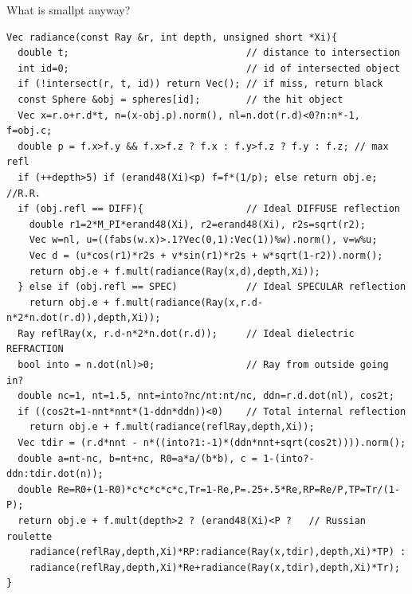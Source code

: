 \documentclass[8pt]{beamer}
\begin{document}
\begin{frame}[fragile]{What is smallpt anyway?}
\footnotesize
\begin{verbatim}
Vec radiance(const Ray &r, int depth, unsigned short *Xi){ 
  double t;                               // distance to intersection 
  int id=0;                               // id of intersected object 
  if (!intersect(r, t, id)) return Vec(); // if miss, return black 
  const Sphere &obj = spheres[id];        // the hit object 
  Vec x=r.o+r.d*t, n=(x-obj.p).norm(), nl=n.dot(r.d)<0?n:n*-1, f=obj.c; 
  double p = f.x>f.y && f.x>f.z ? f.x : f.y>f.z ? f.y : f.z; // max refl 
  if (++depth>5) if (erand48(Xi)<p) f=f*(1/p); else return obj.e; //R.R. 
  if (obj.refl == DIFF){                  // Ideal DIFFUSE reflection 
    double r1=2*M_PI*erand48(Xi), r2=erand48(Xi), r2s=sqrt(r2); 
    Vec w=nl, u=((fabs(w.x)>.1?Vec(0,1):Vec(1))%w).norm(), v=w%u; 
    Vec d = (u*cos(r1)*r2s + v*sin(r1)*r2s + w*sqrt(1-r2)).norm(); 
    return obj.e + f.mult(radiance(Ray(x,d),depth,Xi)); 
  } else if (obj.refl == SPEC)            // Ideal SPECULAR reflection 
    return obj.e + f.mult(radiance(Ray(x,r.d-n*2*n.dot(r.d)),depth,Xi)); 
  Ray reflRay(x, r.d-n*2*n.dot(r.d));     // Ideal dielectric REFRACTION 
  bool into = n.dot(nl)>0;                // Ray from outside going in? 
  double nc=1, nt=1.5, nnt=into?nc/nt:nt/nc, ddn=r.d.dot(nl), cos2t; 
  if ((cos2t=1-nnt*nnt*(1-ddn*ddn))<0)    // Total internal reflection 
    return obj.e + f.mult(radiance(reflRay,depth,Xi)); 
  Vec tdir = (r.d*nnt - n*((into?1:-1)*(ddn*nnt+sqrt(cos2t)))).norm(); 
  double a=nt-nc, b=nt+nc, R0=a*a/(b*b), c = 1-(into?-ddn:tdir.dot(n)); 
  double Re=R0+(1-R0)*c*c*c*c*c,Tr=1-Re,P=.25+.5*Re,RP=Re/P,TP=Tr/(1-P); 
  return obj.e + f.mult(depth>2 ? (erand48(Xi)<P ?   // Russian roulette 
    radiance(reflRay,depth,Xi)*RP:radiance(Ray(x,tdir),depth,Xi)*TP) : 
    radiance(reflRay,depth,Xi)*Re+radiance(Ray(x,tdir),depth,Xi)*Tr); 
} 
\end{verbatim}
\end{frame}
\end{document}
